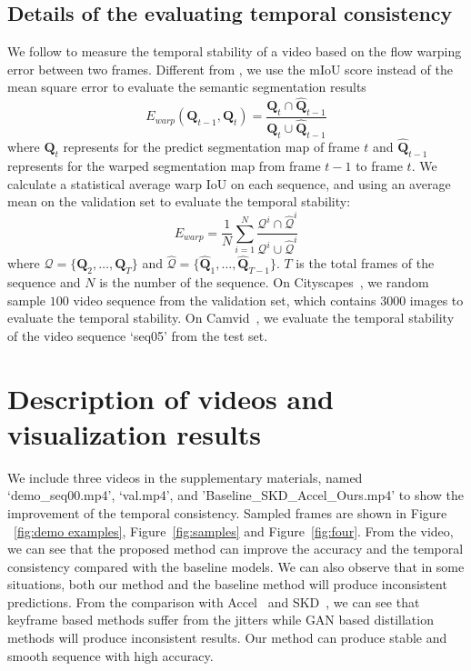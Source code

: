 \documentclass[runningheads]{llncs}
\begin{document}
\subsection{Details of the evaluating temporal consistency}
We follow \cite{lai2018learning} to measure the temporal stability of a video based on the flow warping error between two frames.
Different from \cite{lai2018learning}, we use the mIoU score instead of the mean square error to evaluate the semantic segmentation results
\begin{equation}
    E_{warp}({\mathbf{Q}_{t-1},\mathbf{Q}_{t}})=\frac{\mathbf{Q}_{t}\cap \hat{\mathbf{Q}}_{t-1}}{\mathbf{Q}_{t}\cup \hat{\mathbf{Q}}_{t-1}}
\end{equation}
where $\mathbf{Q}_{t}$ represents for the predict segmentation map of frame $t$ and $\hat{\mathbf{Q}}_{t-1}$ represents for the warped segmentation map from frame $t-1$ to frame $t$.
We calculate a statistical average warp IoU on each sequence, and using an average mean on the validation set to evaluate the temporal stability:
\begin{equation}
    E_{warp}=\frac{1}{N}\sum_{i=1}^{N}\frac{\mathcal{Q}^{i}\cap \hat{\mathcal{Q}}^{i}}{\mathcal{Q}^{i}\cup \hat{\mathcal{Q}}^{i}}
\end{equation}
where $\mathcal{Q}=\{\mathbf{Q}_2,\dots,\mathbf{Q}_{T}\}$ and $\hat{\mathcal{Q}}=\{\hat{\mathbf{Q}}_1,\dots,\hat{\mathbf{Q}}_{T-1}\}$. $T$ is the total frames of the sequence and $N$ is the number of the sequence.
On Cityscapes~\cite{Cordts2016Cityscapes}, we random sample $100$ video sequence from the validation set, which contains $3000$ images to evaluate the temporal stability. On Camvid~\cite{brostow2008segmentation}, we evaluate the temporal stability of the video sequence `seq05' from the test set.


\section{Description of videos and visualization results}
We include three videos in the supplementary materials, named `demo\_seq00.mp4', `val.mp4', and 'Baseline\_SKD\_Accel\_Ours.mp4' to show the improvement of the temporal consistency. Sampled frames are shown in Figure ~\ref{fig:demo examples}, Figure~\ref{fig:samples} and Figure~\ref{fig:four}. From the video, we can see that the proposed method can improve the accuracy and the temporal consistency compared with the baseline models. We can also observe that in some situations, both our method and the baseline method will produce inconsistent predictions. From the comparison with Accel~\cite{jain2019accel} and SKD~\cite{liu2019structured}, we can see that keyframe based methods suffer from the jitters while GAN based distillation methods will produce inconsistent results. Our method can produce stable and smooth sequence with high accuracy.
\end{document}
